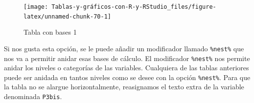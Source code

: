 \documentclass[
]{book}
\newenvironment{Shaded}{\begin{snugshade}}{\end{snugshade}}
\newcommand{\AttributeTok}[1]{\textcolor[rgb]{0.77,0.63,0.00}{#1}}
\newcommand{\DecValTok}[1]{\textcolor[rgb]{0.00,0.00,0.81}{#1}}
\newcommand{\FunctionTok}[1]{\textcolor[rgb]{0.00,0.00,0.00}{#1}}
\newcommand{\NormalTok}[1]{#1}
\newcommand{\OtherTok}[1]{\textcolor[rgb]{0.56,0.35,0.01}{#1}}
\newcommand{\SpecialCharTok}[1]{\textcolor[rgb]{0.00,0.00,0.00}{#1}}
\begin{document}
\begin{Shaded}
\end{Shaded}

\begin{figure}[H]

{\centering \texttt{[image: Tablas-y-gráficos-con-R-y-RStudio\_files/figure-latex/unnamed-chunk-70-1]} 

}

\caption{Tabla con bases 1}\label{fig:unnamed-chunk-70}
\end{figure}

Si nos gusta esta opción, se le puede añadir un modificador llamado \texttt{\%nest\%} que nos va a permitir anidar esas bases de cálculo. El modificador \texttt{\%nest\%} nos permite anidar los niveles o categorías de las variables. Cualquiera de las tablas anteriores puede ser anidada en tantos niveles como se desee con la opción \texttt{\%nest\%}. Para que la tabla no se alargue horizontalmente, reasignamos el texto extra de la variable denominada \texttt{P3bis}.
\end{document}
